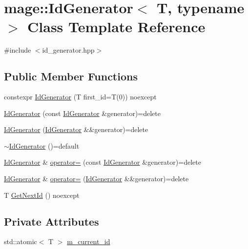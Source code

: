 \hypertarget{classmage_1_1_id_generator}{}\section{mage\+:\+:Id\+Generator$<$ T, typename $>$ Class Template Reference}
\label{classmage_1_1_id_generator}


{\ttfamily \#include $<$id\+\_\+generator.\+hpp$>$}

\subsection*{Public Member Functions}
\begin{DoxyCompactItemize}
\item 
constexpr \mbox{\hyperlink{classmage_1_1_id_generator_a8a8af49fb938745d014bfdf9ccf65142}{Id\+Generator}} (T first\+\_\+id=T(0)) noexcept
\item 
\mbox{\hyperlink{classmage_1_1_id_generator_aa0beb004264991856911f8718748a9c1}{Id\+Generator}} (const \mbox{\hyperlink{classmage_1_1_id_generator}{Id\+Generator}} \&generator)=delete
\item 
\mbox{\hyperlink{classmage_1_1_id_generator_a65f85b6d0858865a346f93876ad121b5}{Id\+Generator}} (\mbox{\hyperlink{classmage_1_1_id_generator}{Id\+Generator}} \&\&generator)=delete
\item 
\mbox{\hyperlink{classmage_1_1_id_generator_abdf26785e483c70cc68dc5816d15e2b6}{$\sim$\+Id\+Generator}} ()=default
\item 
\mbox{\hyperlink{classmage_1_1_id_generator}{Id\+Generator}} \& \mbox{\hyperlink{classmage_1_1_id_generator_a4dec3d729d233fac7ab00a13407c565f}{operator=}} (const \mbox{\hyperlink{classmage_1_1_id_generator}{Id\+Generator}} \&generator)=delete
\item 
\mbox{\hyperlink{classmage_1_1_id_generator}{Id\+Generator}} \& \mbox{\hyperlink{classmage_1_1_id_generator_a4b961b163059ef9a604491b5086f1b01}{operator=}} (\mbox{\hyperlink{classmage_1_1_id_generator}{Id\+Generator}} \&\&generator)=delete
\item 
T \mbox{\hyperlink{classmage_1_1_id_generator_a442beff7c7e810554f6bf5331c0d4fb8}{Get\+Next\+Id}} () noexcept
\end{DoxyCompactItemize}
\subsection*{Private Attributes}
\begin{DoxyCompactItemize}
\item 
std\+::atomic$<$ T $>$ \mbox{\hyperlink{classmage_1_1_id_generator_a4b7ad6d3d123054eeae05619e18c7c70}{m\+\_\+current\+\_\+id}}
\end{DoxyCompactItemize}


